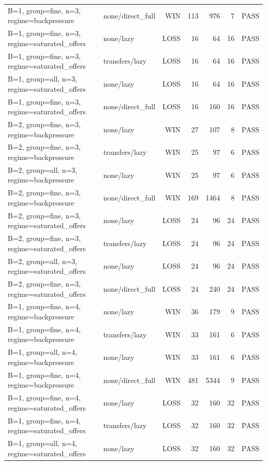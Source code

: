 \begin{longtable}{llrrrrl}
B=1, group=fine, n=3, regime=backpressure & none/direct\_full & WIN & 113 & 976 & 7 & PASS \\
B=1, group=fine, n=3, regime=saturated\_offers & none/lazy & LOSS & 16 & 64 & 16 & PASS \\
B=1, group=fine, n=3, regime=saturated\_offers & transfers/lazy & LOSS & 16 & 64 & 16 & PASS \\
B=1, group=all, n=3, regime=saturated\_offers & none/lazy & LOSS & 16 & 64 & 16 & PASS \\
B=1, group=fine, n=3, regime=saturated\_offers & none/direct\_full & LOSS & 16 & 160 & 16 & PASS \\
B=2, group=fine, n=3, regime=backpressure & none/lazy & WIN & 27 & 107 & 8 & PASS \\
B=2, group=fine, n=3, regime=backpressure & transfers/lazy & WIN & 25 & 97 & 6 & PASS \\
B=2, group=all, n=3, regime=backpressure & none/lazy & WIN & 25 & 97 & 6 & PASS \\
B=2, group=fine, n=3, regime=backpressure & none/direct\_full & WIN & 169 & 1464 & 8 & PASS \\
B=2, group=fine, n=3, regime=saturated\_offers & none/lazy & LOSS & 24 & 96 & 24 & PASS \\
B=2, group=fine, n=3, regime=saturated\_offers & transfers/lazy & LOSS & 24 & 96 & 24 & PASS \\
B=2, group=all, n=3, regime=saturated\_offers & none/lazy & LOSS & 24 & 96 & 24 & PASS \\
B=2, group=fine, n=3, regime=saturated\_offers & none/direct\_full & LOSS & 24 & 240 & 24 & PASS \\
B=1, group=fine, n=4, regime=backpressure & none/lazy & WIN & 36 & 179 & 9 & PASS \\
B=1, group=fine, n=4, regime=backpressure & transfers/lazy & WIN & 33 & 161 & 6 & PASS \\
B=1, group=all, n=4, regime=backpressure & none/lazy & WIN & 33 & 161 & 6 & PASS \\
B=1, group=fine, n=4, regime=backpressure & none/direct\_full & WIN & 481 & 5344 & 9 & PASS \\
B=1, group=fine, n=4, regime=saturated\_offers & none/lazy & LOSS & 32 & 160 & 32 & PASS \\
B=1, group=fine, n=4, regime=saturated\_offers & transfers/lazy & LOSS & 32 & 160 & 32 & PASS \\
B=1, group=all, n=4, regime=saturated\_offers & none/lazy & LOSS & 32 & 160 & 32 & PASS \\

\end{longtable}
